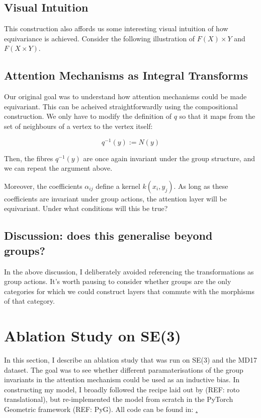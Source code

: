 \documentclass[11pt]{article}
\begin{document}
\subsection*{Visual Intuition}

This construction also affords us some interesting visual intuition of how equivariance is achieved. Consider the following illustration of $F(X) \times Y$ and $F(X \times Y)$.

\subsection*{Attention Mechanisms as Integral Transforms}

Our original goal was to understand how attention mechanisms could be made equivariant. This can be acheived straightforwardly using the compositional construction. We only have to modify the definition of $q$ so that it maps from the set of neighbours of a vertex to the vertex itself:

$$ q^{-1}(y) := N(y)$$

Then, the fibres $q^{-1}(y)$ are once again invariant under the group structure, and we can repeat the argument above.

Moreover, the coefficients $\alpha_{ij}$ define a kernel $k(x_i, y_j)$. As long as these coefficients are invariant under group actions, the attention layer will be equivariant. Under what conditions will this be true?


\subsection*{Discussion: does this generalise beyond groups?}


In the above discussion, I deliberately avoided referencing the transformations as group actions. It's worth pausing to consider whether groups are the only categories for which we could construct layers that commute with the morphisms of that category. 


\section{Ablation Study on SE(3)}

In this section, I describe an ablation study that was run on SE(3) and the MD17 dataset. The goal was to see whether different paramaterisations of the group invariants in the attention mechanism could be used as an inductive bias. In constructing my model, I broadly followed the recipe laid out by (REF: roto translational), but re-implemented the model from scratch in the PyTorch Geometric framework (REF: PyG). All code can be found in: \href{https://github.com/nsmat/transformer_invariants}.
\end{document}
